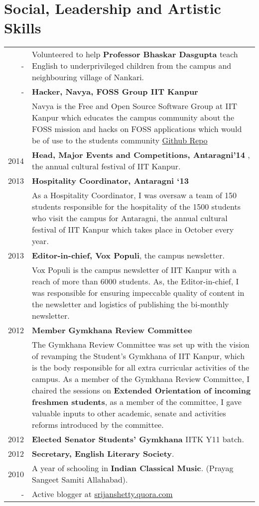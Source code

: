\documentclass[a4paper,10pt]{article} %
\begin{document}
\section {Social, Leadership and Artistic Skills}
\begin{tabular}{rp{12cm}}

    -    & Volunteered to help \textbf{Professor Bhaskar Dasgupta} teach English to underprivileged children from the campus
           and neighbouring village of Nankari.\\
    -    & \textbf{Hacker, Navya, FOSS Group IIT Kanpur}\\
         & \footnotesize{Navya is the Free and Open Source Software Group at IIT
           Kanpur which educates the campus community about the FOSS mission and
           hacks on FOSS applications which would be of use to the students
           community \href{https://github.com/navya} {Github Repo}} \\
    2014 & \textbf{Head, Major Events and Competitions, Antaragni'14} , the annual cultural festival of
    IIT Kanpur. \\
    2013 & \textbf{Hospitality Coordinator, Antaragni ‘13}\\
         & \footnotesize{As a Hospitality Coordinator, I was oversaw a team of 150 students responsible for
            the hospitality of the 1500 students who visit the campus for Antaragni, the annual cultural festival
            of IIT Kanpur which takes place in October every year.}\\
    2013 & \textbf{Editor-in-chief, Vox Populi}, the campus newsletter. \\
         & \footnotesize{Vox Populi is the campus newsletter of IIT Kanpur with a reach of more than 6000 students.
            As, the Editor-in-chief, I was responsible for ensuring impeccable quality of content in the newsletter and
            logistics of publishing the bi-monthly newsletter.}\\
    2012 & \textbf{Member Gymkhana Review Committee}\\
         & \footnotesize{The Gymkhana Review Committee was set up with the vision of revamping the Student's Gymkhana
            of IIT Kanpur, which is the body responsible for all extra curricular activities of the campus. As a
            member of the Gymkhana Review Committee, I chaired the sessions on \textbf{Extended Orientation of
            incoming freshmen students}, as a member of the committee, I gave valuable inputs to other academic,
            senate and activities reforms introduced by the committee.}\\
    2012 & \textbf{Elected Senator Students' Gymkhana} IITK Y11 batch. \\
    2012 & \textbf{Secretary, English Literary Society}. \\
    2010 & A year of schooling in \textbf{Indian Classical Music}. (Prayag Sangeet Samiti Allahabad). \\
    -   & Active blogger at \href{srijanshetty.quora.com} {srijanshetty.quora.com} \\

\end{tabular}
\end{document}
